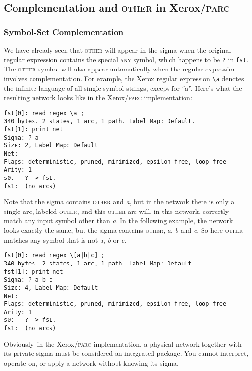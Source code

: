 \documentclass[letterpaper,11pt]{article}
\providecommand{\acro}{}\renewcommand{\acro}{\textsc}
\begin{document}
\subsection{Complementation and \acro{other} in Xerox/\acro{parc}}


\subsubsection{Symbol-Set Complementation}

We have already seen that \acro{other} will appear in the sigma when the original regular
expression contains the special \acro{any} symbol, which happens to
be \texttt{?} in \texttt{fst}.
The \acro{other} symbol will also appear automatically when the regular expression
involves complementation.  For example, the Xerox regular expression
\verb!\!\texttt{a} denotes the infinite
language of all single-symbol strings, except for ``a''.  Here's what the resulting
network looks like in the Xerox/\acro{parc} implementation:

\begin{Verbatim}[fontsize=\footnotesize]
fst[0]: read regex \a ;
340 bytes. 2 states, 1 arc, 1 path. Label Map: Default.
fst[1]: print net
Sigma: ? a
Size: 2, Label Map: Default
Net: 
Flags: deterministic, pruned, minimized, epsilon_free, loop_free
Arity: 1
s0:   ? -> fs1.
fs1:  (no arcs)
\end{Verbatim}

\noindent
Note that the sigma contains \acro{other} and \emph{a}, but in the network there is only
a single arc, labeled \acro{other}, and this \acro{other} arc will, in this network, correctly match any
input symbol other than \emph{a}.  In the following example, the
network looks exactly the same,
but the sigma contains \acro{other}, \emph{a}, \emph{b} and
\emph{c}.  So here \acro{other} matches any symbol that is not
\emph{a}, \emph{b} or \emph{c}.

\begin{Verbatim}[fontsize=\footnotesize]
fst[0]: read regex \[a|b|c] ;
340 bytes. 2 states, 1 arc, 1 path. Label Map: Default.
fst[1]: print net
Sigma: ? a b c
Size: 4, Label Map: Default
Net: 
Flags: deterministic, pruned, minimized, epsilon_free, loop_free
Arity: 1
s0:   ? -> fs1.
fs1:  (no arcs)
\end{Verbatim}

\noindent
Obviously, in the Xerox/\acro{parc} implementation, a physical
network together with its private sigma must be considered an
integrated package.  You cannot interpret, operate on, or apply a network without
knowing its sigma.
\end{document}
